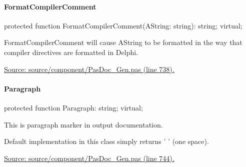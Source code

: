 \documentclass{report}
\newif\ifpdf
\begin{document}
\paragraph*{FormatCompilerComment}\hspace*{\fill}

\label{PasDoc_Gen.TDocGenerator-FormatCompilerComment}
\begin{list}{}{
\setlength{\itemindent}{0cm}
\setlength{\listparindent}{0cm}
\setlength{\leftmargin}{\evensidemargin}
\addtolength{\leftmargin}{\tmplength}
\settowidth{\labelsep}{X}
\addtolength{\leftmargin}{\labelsep}
\setlength{\labelwidth}{\tmplength}
}
\item[\textbf{Declaration}\hfill]
\ifpdf
\begin{flushleft}
\fi
\begin{ttfamily}
protected function FormatCompilerComment(AString: string): string; virtual;\end{ttfamily}

\ifpdf
\end{flushleft}
\fi

\par
\item[\textbf{Description}]
FormatCompilerComment will cause AString to be formatted in the way that compiler directives are formatted in Delphi.\par
\href{https://github.com/pasdoc/pasdoc/blob/master/source/component/PasDoc_Gen.pas#L738}{Source: source/component/PasDoc{\_}Gen.pas (line 738).}

\end{list}
\paragraph*{Paragraph}\hspace*{\fill}

\label{PasDoc_Gen.TDocGenerator-Paragraph}
\begin{list}{}{
\setlength{\itemindent}{0cm}
\setlength{\listparindent}{0cm}
\setlength{\leftmargin}{\evensidemargin}
\addtolength{\leftmargin}{\tmplength}
\settowidth{\labelsep}{X}
\addtolength{\leftmargin}{\labelsep}
\setlength{\labelwidth}{\tmplength}
}
\item[\textbf{Declaration}\hfill]
\ifpdf
\begin{flushleft}
\fi
\begin{ttfamily}
protected function Paragraph: string; virtual;\end{ttfamily}

\ifpdf
\end{flushleft}
\fi

\par
\item[\textbf{Description}]
This is paragraph marker in output documentation.

Default implementation in this class simply returns ' ' (one space).\par
\href{https://github.com/pasdoc/pasdoc/blob/master/source/component/PasDoc_Gen.pas#L744}{Source: source/component/PasDoc{\_}Gen.pas (line 744).}

\end{list}
\end{document}
